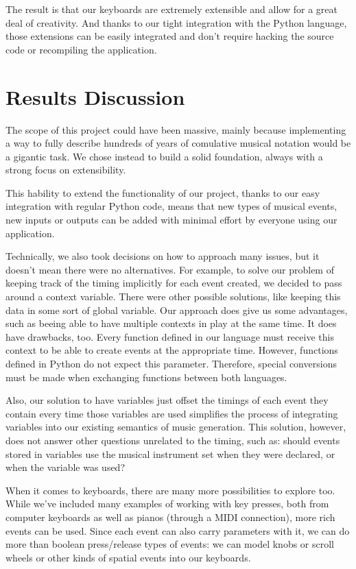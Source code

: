 \documentclass[a4paper,UKenglish,cleveref, autoref]{oasics-v2019}
\begin{document}
The result is that our keyboards are extremely extensible and allow for a great deal of creativity. And thanks to our tight integration with the Python language, those extensions can be easily integrated and don't require hacking the source code or recompiling the application.

\section{Results Discussion}
\label{sec:conclusions}

The scope of this project could have been massive, mainly because implementing a way to fully describe hundreds of years of comulative musical notation would be a gigantic task. We chose instead to build a solid foundation, always with a strong focus on extensibility.

This hability to extend the functionality of our project, thanks to our easy integration with regular Python code, means that new types of musical events, new inputs or outputs can be added with minimal effort by everyone using our application.

Technically, we also took decisions on how to approach many issues, but it doesn't mean there were no alternatives. For example, to solve our problem of keeping track of the timing implicitly for each event created, we decided to pass around a context variable. There were other possible solutions, like keeping this data in some sort of global variable. Our approach does give us some advantages, such as beeing able to have multiple contexts in play at the same time. It does have drawbacks, too. Every function defined in our language must receive this context to be able to create events at the appropriate time. However, functions defined in Python do not expect this parameter. Therefore, special conversions must be made when exchanging functions between both languages.

Also, our solution to have variables just offset the timings of each event they contain every time those variables are used simplifies the process of integrating variables into our existing semantics of music generation. This solution, however, does not answer other questions unrelated to the timing, such as: should events stored in variables use the musical instrument set when they were declared, or when the variable was used?

When it comes to keyboards, there are many more possibilities to explore too. While we've included many examples of working with key presses, both from computer keyboards as well as pianos (through a MIDI connection), more rich events can be used. Since each event can also carry parameters with it, we can do more than boolean press/release types of events: we can model knobs or scroll wheels or other kinds of spatial events into our keyboards.
\end{document}
